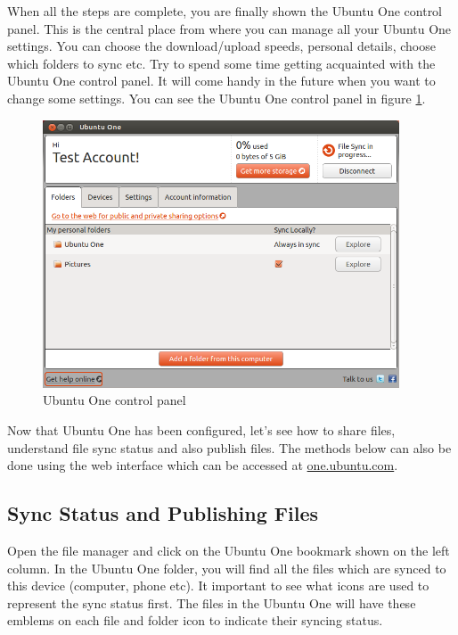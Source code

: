 \newpage
\par \noindent When all the steps are complete, you are finally shown the Ubuntu One control panel. This is the central place from where you can manage all your Ubuntu One settings. You can choose the download/upload speeds, personal details, choose which folders to sync etc. Try to spend some time getting acquainted with the Ubuntu One control panel. It will come handy in the future when you want to change some settings. You can see the Ubuntu One control panel in figure \ref{fig:share10}. \\

\begin{figure}[h!]	
	\centering
	\includegraphics[width=300pt]{./images/basic-tasks/share10.png}
	\caption{Ubuntu One control panel}	
	\label{fig:share10}		
\end{figure}

\par \noindent Now that Ubuntu One has been configured, let's see how to share files, understand file sync status and also publish files. The methods below can also be done using the web interface which can be accessed at \href{https://one.ubuntu.com/}{one.ubuntu.com}.

\subsection*{Sync Status and Publishing Files} 
Open the file manager and click on the Ubuntu One bookmark shown on the left column. In the Ubuntu One folder, you will find all the files which are synced to this device (computer, phone etc).  It important to see what icons are used to represent the sync status first. The files in the Ubuntu One will have these emblems on each file and folder icon to indicate their syncing status. 

